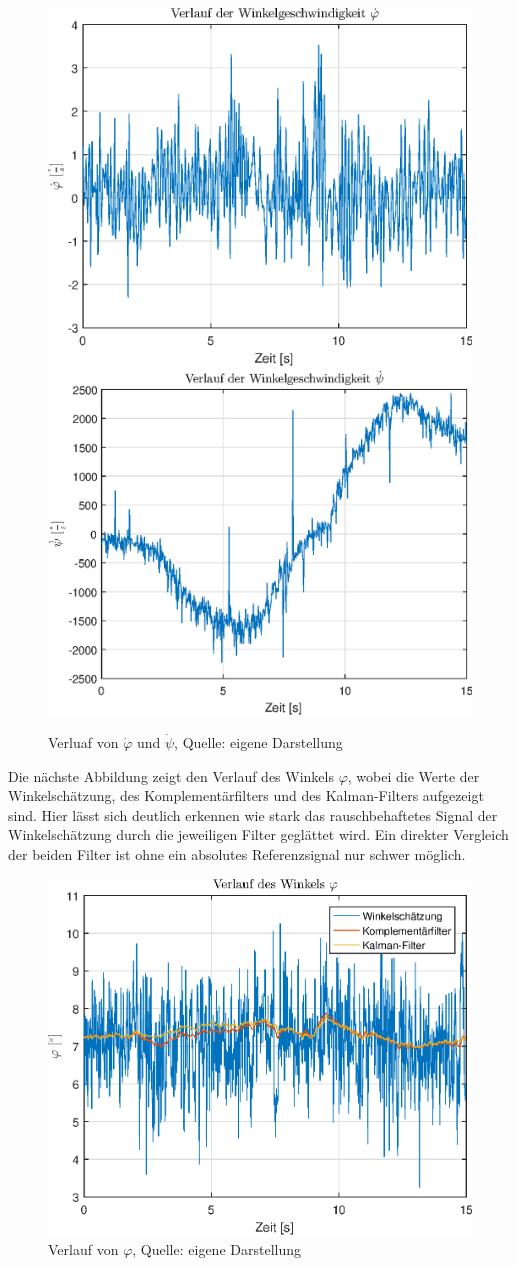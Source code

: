\begin{figure}[h]
\centering
\includegraphics[scale=0.5]{img/phi__d_regelung}
\includegraphics[scale=0.5]{img/psi__d_regelung}
\caption{Verluaf von $\dot{\varphi}$ und $\dot{\psi}$, Quelle: eigene Darstellung}
\end{figure}

\newpage
Die nächste Abbildung zeigt den Verlauf des Winkels $\varphi$, wobei die Werte der Winkelschätzung, des Komplementärfilters und des Kalman-Filters aufgezeigt sind. Hier lässt sich deutlich erkennen wie stark das rauschbehaftetes Signal der Winkelschätzung durch die jeweiligen Filter geglättet wird. Ein direkter Vergleich der beiden Filter ist ohne ein absolutes Referenzsignal nur schwer möglich.

\begin{figure}[h!]
\centering
\includegraphics[width=0.5\linewidth]{img/phi_regelung}
\caption{Verlauf von $\varphi$, Quelle: eigene Darstellung}
\end{figure}

